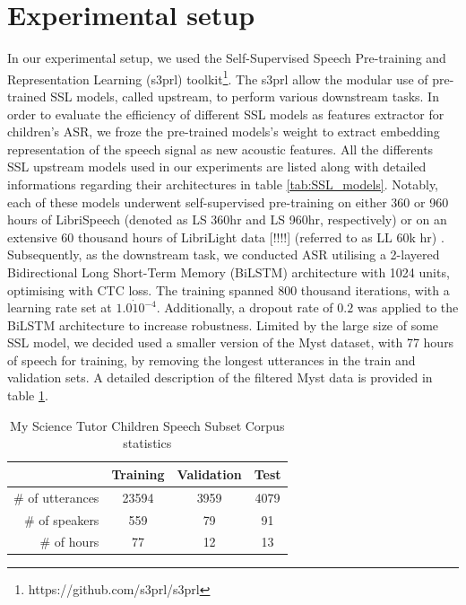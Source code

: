 \section{Experimental setup}
In our experimental setup, we used the Self-Supervised Speech Pre-training and Representation Learning (s3prl) toolkit\footnote{https://github.com/s3prl/s3prl}. The s3prl allow the modular use of pre-trained SSL models, called upstream, to perform various downstream tasks. In order to evaluate the efficiency of different SSL models as features extractor for children's ASR, we froze the pre-trained models's weight to extract embedding representation of the speech signal as new acoustic features. All the differents SSL upstream models used in our experiments are listed along with detailed informations regarding their architectures in table \ref{tab:SSL_models}. Notably, each of these models underwent self-supervised pre-training on either 360 or 960 hours of LibriSpeech \cite{librispeech} (denoted as LS 360hr and LS 960hr, respectively) or on an extensive 60 thousand hours of LibriLight data [!!!!] (referred to as LL 60k hr) . 
Subsequently, as the downstream task, we conducted ASR utilising a 2-layered Bidirectional Long Short-Term Memory (BiLSTM) architecture with 1024 units, optimising with CTC loss.  The training spanned 800 thousand iterations, with a learning rate set at $1.0\dot 10^{-4}$. Additionally, a dropout rate of $0.2$ was applied to the BiLSTM architecture to increase robustness. Limited  by the large size of some SSL model, we decided used a smaller version of the Myst \cite{MyST} dataset, with 77 hours of speech for training, by removing the longest utterances in the train and validation sets. A detailed description of the filtered Myst data is provided in table \ref{tab:ssl_myst}.
\begin{table}[h!]
    \caption{My Science Tutor Children Speech Subset Corpus statistics}
    
    \begin{center}
    \begin{tabular}{r|c|c|c}
    \hline
     & Training & Validation     & Test   \\ \hline
    \# of utterances & 23594   & 3959    & 4079  \\ 
    \# of speakers & 559  & 79    & 91  \\ 
    \# of hours & 77   & 12    & 13  \\ \hline
    \end{tabular}
    \label{tab:ssl_myst}
    \end{center}
    \end{table}

